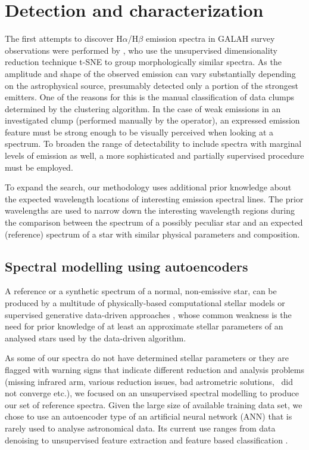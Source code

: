 \section{Detection and characterization}
\label{sec:det_chart}
The first attempts to discover H$\alpha$/H$\beta$ emission spectra in GALAH survey observations were performed by \citet{2017ApJS..228...24T}, who use the unsupervised dimensionality reduction technique t-SNE \citep{2013arXiv1301.3342V} to group morphologically similar spectra. As the amplitude and shape of the observed emission can vary substantially depending on the astrophysical source, \citet{2017ApJS..228...24T} presumably detected only a portion of the strongest emitters. One of the reasons for this is the manual classification of data clumps determined by the clustering algorithm. In the case of weak emissions in an investigated clump (performed manually by the operator), an expressed emission feature must be strong enough to be visually perceived when looking at a spectrum. To broaden the range of detectability to include spectra with marginal levels of emission as well, a more sophisticated and partially supervised procedure must be employed.

To expand the search, our methodology uses additional prior knowledge about the expected wavelength locations of interesting emission spectral lines. The prior wavelengths are used to narrow down the interesting wavelength regions during the comparison between the spectrum of a possibly peculiar star and an expected (reference) spectrum of a star with similar physical parameters and composition.

\subsection{Spectral modelling using autoencoders}
\label{sec:ref_modeling}
A reference or a synthetic spectrum of a normal, non-emissive star, can be produced by a multitude of physically-based computational stellar models \citep{1993sssp.book.....K, 2005A&A...442.1127M, 2012ASInC...6...53D} or supervised generative data-driven approaches \citep{2015AAS...22530207N, 2019ApJ...879...69T}, whose common weakness is the need for prior knowledge of at least an approximate stellar parameters of an analysed stars used by the data-driven algorithm.

As some of our spectra do not have determined stellar parameters or they are flagged with warning signs that indicate different reduction and analysis problems (missing infrared arm, various reduction issues, bad astrometric solutions, \SME\ did not converge etc.), we focused on an unsupervised spectral modelling to produce our set of reference spectra. Given the large size of available training data set, we chose to use an autoencoder type of an artificial neural network (ANN) that is rarely used to analyse astronomical data. Its current use ranges from data denoising \citep{2017ChA&A..41..282Q, 2019arXiv190303105S, 2019MNRAS.485.2628L} to unsupervised feature extraction and feature based classification \citep{2015MNRAS.452..158Y, 2017RAA....17...36L, 2017ChA&A..41..318P, 2018arXiv180901434K, 2019arXiv191104320C, 2019ApJS..240...34M, 2019PASP..131j8011R}.

